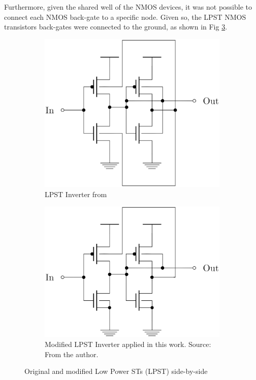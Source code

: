 \documentclass[pgmicro,diss,english]{iiufrgs}
\begin{document}
Furthermore, given the shared well of the NMOS devices, it was not possible to connect each NMOS back-gate to a specific node. Given so, the LPST NMOS transistors back-gates were connected to the ground, as shown in Fig \ref{fig:test}.

\begin{figure}[]
\centering
\begin{subfigure}{.45\textwidth}
  \centering
  \includegraphics[width=\linewidth]{STOriginal.eps}
  \caption{LPST Inverter from \citet{dokania2015circuit}}
  \label{fig:sub1}
\end{subfigure}%
\hspace{1em}
\begin{subfigure}{.45\textwidth}
  \centering
  \includegraphics[width=\linewidth]{STcorrigido.eps}
  \caption{Modified LPST Inverter applied in this work. Source: From the author.}
  \label{fig:sub2}
\end{subfigure}
\caption{Original and modified Low Power STs (LPST) side-by-side}
\label{fig:test}
\end{figure}
\end{document}
